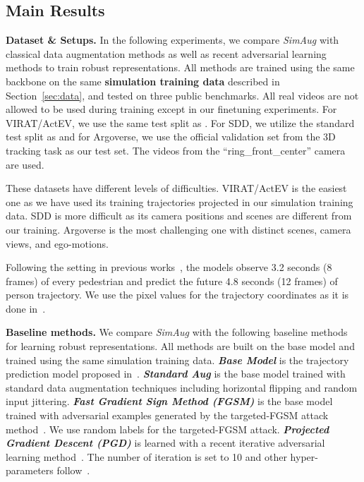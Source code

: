 \documentclass[runningheads]{eccv2020/llncs}
\newcommand{\fancyname}{SimAug}
\begin{document}
\subsection{Main Results}
\label{sec:exp_main}
\noindent\textbf{Dataset \& Setups.} 
In the following experiments, we compare \textit{\fancyname} with classical data augmentation methods as well as recent adversarial learning methods to train robust representations.
All methods are trained using the same backbone on the same \textbf{simulation training data} described in Section~\ref{sec:data}, and tested on three public benchmarks. All real videos are not allowed to be used during training except in our finetuning experiments. For VIRAT/ActEV, we use the same test split as \cite{liang2019peeking,liang2020garden}. 
For SDD, we utilize the standard test split as \cite{sadeghian2018sophie,deo2020trajectory} and for Argoverse, we use the official validation set from the 3D tracking task as our test set. The videos from the ``ring\_front\_center'' camera are used.


These datasets have different levels of difficulties. VIRAT/ActEV is the easiest one as we have used its training trajectories projected in our simulation training data. SDD is more difficult as its camera positions and scenes are different from our training. Argoverse is the most challenging one with distinct scenes, camera views, and ego-motions.



Following the setting in previous works~\cite{liang2019peeking,alahi2016social,gupta2018social,alahi2016social,gupta2018social,sadeghian2018sophie,makansi2019overcoming,liang2020garden,deo2020trajectory}, 
the models observe 3.2 seconds (8 frames) of every pedestrian and predict the future 4.8 seconds (12 frames) of person trajectory. 
We use the pixel values for the trajectory coordinates as it is done in~\cite{yagi2018future,liang2019peeking,lee2017desire,chai2019multipath,li2019way,makansi2019overcoming,bansal2018chauffeurnet,hong2019rules,deo2020trajectory}. 

\noindent\textbf{Baseline methods.} 
We compare \textit{\fancyname} with the following baseline methods for learning robust representations. All methods are built on the base model and trained using the same simulation training data.
\textbf{\textit{Base Model}} is the trajectory prediction model proposed in~\cite{liang2020garden}.
\textbf{\textit{Standard Aug}} is the base model trained with standard data augmentation techniques including horizontal flipping and random input jittering. 
\textbf{\textit{Fast Gradient Sign Method (FGSM)}} is the base model trained with adversarial examples generated by the targeted-FGSM attack method~\cite{goodfellow2014explaining}. We use random labels for the targeted-FGSM attack. 
\textbf{\textit{Projected Gradient Descent (PGD)}} is learned with a recent iterative adversarial learning method~\cite{madry2017towards,xie2019feature}. The number of iteration is set to 10 and other hyper-parameters follow~\cite{xie2019feature}.
\end{document}
